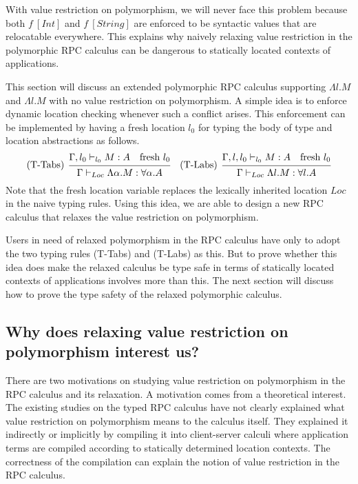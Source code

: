 \documentclass[a4paper]{article}
\theoremstyle{plain}
\theoremstyle{definition}
\newcommand{\tyenv}{\Gamma}
\newcommand{\tyenvExtWith}[1]{\Gamma,#1}
\newcommand{\typing}[4]{#1\vdash_{#2} #3 : #4}
\newcommand{\Loc}{Loc}
\begin{document}
%
With value restriction on polymorphism, we will never face this
problem because both $f \ [Int]$ and $f \ [String]$ are enforced to be
syntactic values that are relocatable everywhere.
%
This explains why naively relaxing value restriction in the
polymorphic RPC calculus can be dangerous to statically located
contexts of applications.


%
This section will discuss an extended polymorphic RPC calculus
supporting $\Lambda l.M$ and $\Lambda l.M$ with no value restriction
on polymorphism.
%
A simple idea is to enforce dynamic location checking whenever such a
conflict arises.
%
This enforcement can be implemented by having a fresh location $l_0$
for typing the body of type and location abstractions as follows.
%
\[
    \begin{prooftree}
      \hypo{  \typing{\tyenv,l_0}{l_0}{M}{A} \ \ \ \mbox{fresh} \ l_0}
      \infer[left label=(T-Tabs)]1{ \typing{\tyenv}{\Loc}{\Lambda\alpha. M}{\forall\alpha. A}   }
    \end{prooftree}
    \ \ \
    \begin{prooftree}
      \hypo{ \typing{\tyenvExtWith{l},l_0}{l_0}{M}{A}  \ \ \ \mbox{fresh} \ l_0}
      \infer[left label=(T-Labs)]1{ \typing{\tyenv}{\Loc}{\Lambda l. M}{\forall l. A }}
    \end{prooftree}
\]
%
Note that the fresh location variable replaces the lexically inherited
location $\Loc$ in the naive typing rules.
%
Using this idea, we are able to design a new RPC calculus that relaxes
the value restriction on polymorphism.

%
Users in need of relaxed polymorphism in the RPC calculus have only to
adopt the two typing rules (T-Tabs) and (T-Labs) as this.
%
But to prove whether this idea does make the relaxed calculus be type
safe in terms of statically located contexts of applications involves
more than this.
%
The next section will discuss how to prove the type safety of the
relaxed polymorphic calculus.

\subsection{Why does relaxing value restriction on polymorphism interest us?}

%
There are two motivations on studying value restriction on
polymorphism in the RPC calculus and its relaxation.
%
A motivation comes from a theoretical interest.
%
The existing studies on the typed RPC calculus have not clearly
explained what value restriction on polymorphism means to the calculus
itself.
%
They explained it indirectly or implicitly by compiling it into
client-server calculi where application terms are compiled according
to statically determined location contexts.
%
The correctness of the
compilation can explain the notion of value restriction in the RPC
calculus.
\end{document}
